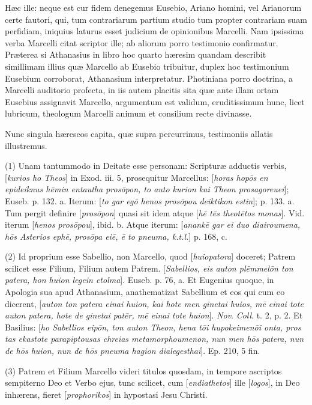 Hæc
ille: neque est cur fidem denegemus Eusebio, Ariano homini, vel
Arianorum certe fautori, qui, tum contrariarum partium studio tum
propter contrariam suam perfidiam, iniquius laturus esset judicium de
opinionibus Marcelli. Nam ipsissima verba Marcelli citat scriptor ille;
ab aliorum porro testimonio confirmatur. Præterea si Athanasius in
libro hoc quarto hæresim quandam describit simillimam illius quæ
Marcello ab Eusebio tribuitur, duplex hoc testimonium Eusebium
corroborat, Athanasium interpretatur. Photiniana porro doctrina, a
Marcelli auditorio profecta, in iis autem placitis sita quæ ante
illam ortam Eusebius assignavit Marcello, argumentum est validum,
eruditissimum hunc, licet lubricum, theologum Marcelli animum et
consilium recte divinasse.

Nunc
singula hæreseos capita, quæ supra percurrimus, testimoniis allatis
illustremus.

(1)
Unam tantummodo in Deitate esse personam: Scripturæ adductis
verbis, [\emph{kurios ho Theos}] in Exod. iii. 5, prosequitur
Marcellus: [\emph{horas hop\={o}s en epideiknus h\={e}min entautha
pros\={o}pon, to auto kurion kai Theon prosagoreuei}]; Euseb. p.
132. a. Iterum: [\emph{to gar eg\={o} henos pros\={o}pou deiktikon
estin}]; p. 133. a. Tum pergit definire [\emph{pros\={o}pon}]
quasi sit idem atque [\emph{h\={e} t\={e}s theot\={e}tos monas}].
Vid. iterum [\emph{henos pros\={o}pou}], ibid. b. Atque iterum: [\emph{anank\={e}
gar ei duo diairoumena, h\={o}s Asterios eph\={e}, pros\={o}pa
ei\={e}, \={e} to pneuma, k.t.l.}] p. 168, c.

(2)
Id proprium esse Sabellio, non Marcello, quod [\emph{huiopatora}]
doceret; Patrem scilicet esse Filium, Filium autem Patrem. [\emph{Sabellios,
eis auton pl\={e}mmel\={o}n ton patera, hon huion legein etolma}].
Euseb. p. 76, a. Et Eugenius quoque, in Apologia sua apud Athanasium,
anathematizat Sabellium et eos qui cum eo dicerent, [\emph{auton ton
patera einai huion, kai hote men ginetai huios, m\={e} einai tote
auton patera, hote de ginetai pat\={e}r, m\={e} einai tote huion}].
\emph{Nov}. \emph{Coll}. t. 2, p. 2. Et Basilius: [\emph{ho Sabellios eip\={o}n,
ton auton Theon, hena t\={o}i hupokeimen\={o}i onta, pros tas ekastote
parapiptousas chreias metamorphoumenon, nun men h\={o}s patera, nun
de h\={o}s huion, nun de h\={o}s pneuma hagion dialegesthai}].
Ep. 210, 5 fin.

(3)
Patrem et Filium Marcello videri titulos quosdam, in tempore ascriptos
sempiterno Deo et Verbo ejus, tunc scilicet, cum [\emph{endiathetos}]
ille [\emph{logos}], in Deo inhærens, fieret [\emph{prophorikos}] in
hypostasi Jesu Christi.

